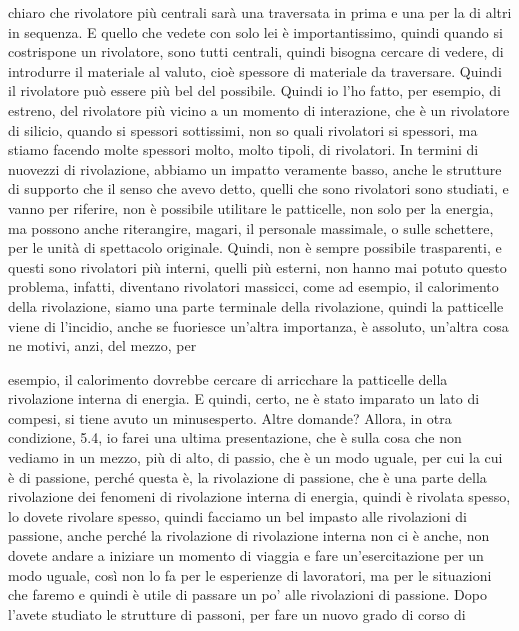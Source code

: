 chiaro che rivolatore più centrali sarà una traversata in prima e una per la di altri in sequenza. E quello che vedete con solo lei è importantissimo, quindi quando si costrispone un rivolatore, sono tutti centrali, quindi bisogna cercare di vedere, di introdurre il materiale al valuto, cioè spessore di materiale da traversare. Quindi il rivolatore può essere più bel del possibile. Quindi io l'ho fatto, per esempio, di estreno, del rivolatore più vicino a un momento di interazione, che è un rivolatore di silicio, quando si spessori sottissimi, non so quali rivolatori si spessori, ma stiamo facendo molte spessori molto, molto tipoli, di rivolatori. In termini di nuovezzi di rivolazione, abbiamo un impatto veramente basso, anche le strutture di supporto che il senso che avevo detto, quelli che sono rivolatori sono studiati, e vanno per riferire, non è possibile utilitare le patticelle, non solo per la energia, ma possono anche riterangire, magari, il personale massimale, o sulle schettere, per le unità di spettacolo originale. Quindi, non è sempre possibile trasparenti, e questi sono rivolatori più interni, quelli più esterni, non hanno mai potuto questo problema, infatti, diventano rivolatori massicci, come ad esempio, il calorimento della rivolazione, siamo una parte terminale della rivolazione, quindi la patticelle viene di l'incidio, anche se fuoriesce un'altra importanza, è assoluto, un'altra cosa ne motivi, anzi, del mezzo, per 

esempio, il calorimento dovrebbe cercare di arricchare la patticelle della rivolazione interna di energia. E quindi, certo, ne è stato imparato un lato di compesi, si tiene avuto un minusesperto. Altre domande? Allora, in otra condizione, 5.4, io farei una ultima presentazione, che è sulla cosa che non vediamo in un mezzo, più di alto, di passio, che è un modo uguale, per cui la cui è di passione, perché questa è, la rivolazione di passione, che è una parte della rivolazione dei fenomeni di rivolazione interna di energia, quindi è rivolata spesso, lo dovete rivolare spesso, quindi facciamo un bel impasto alle rivolazioni di passione, anche perché la rivolazione di rivolazione interna non ci è anche, non dovete andare a iniziare un momento di viaggia e fare un'esercitazione per un modo uguale, così non lo fa per le esperienze di lavoratori, ma per le situazioni che faremo e quindi è utile di passare un po' alle rivolazioni di passione. Dopo l'avete studiato le strutture di passoni, per fare un nuovo grado di corso di 

